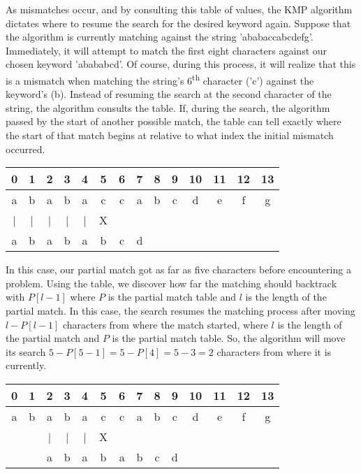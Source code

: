 As mismatches occur, and by consulting this table of values, the KMP algorithm dictates where to resume the search for the desired keyword again.
Suppose that the algorithm is currently matching against the string 'ababaccabcdefg'.
Immediately, it will attempt to match the first eight characters against our chosen keyword 'abababcd'.
Of course, during this process, it will realize that this is a mismatch when matching the string's 6\textsuperscript{th} character ('c') against the keyword's (b).
Instead of resuming the search at the second character of the string, the algorithm consults the table.
If, during the search, the algorithm passed by the start of another possible match, the table can tell exactly where the start of that match begins at relative to what index the initial mismatch occurred.

\begin{table}[h]
	\begin{center}
		\begin{tabular}{ | c | c | c | c | c | c | c | c | c | c | c | c | c | c | }
			\hline
			0 & 1 & 2 & 3 & 4 & 5 & 6 & 7 & 8 & 9 & 10 & 11 & 12 & 13 \\ \hline
			a & b & a & b & a & c & c & a & b & c & d & e & f & g \\ \hline
			| & | & | & | & | & X &   &   &   &   &   &   &   &   \\ \hline
			a & b & a & b & a & b & c & d &   &   &   &   &   &   \\ \hline
		\end{tabular}
	\end{center}
\end{table}

In this case, our partial match got as far as five characters before encountering a problem.
Using the table, we discover how far the matching should backtrack with $P[l - 1]$ where $P$ is the partial match table and $l$ is the length of the partial match.
In this case, the search resumes the matching process after moving $l - P[l - 1]$ characters from where the match started, where $l$ is the length of the partial match and $P$ is the partial match table.
So, the algorithm will move its search $5 - P[5 - 1] = 5 - P[4] = 5 - 3 = 2$ characters from where it is currently.

\begin{table}[h]
	\begin{center}
		\begin{tabular}{ | c | c | c | c | c | c | c | c | c | c | c | c | c | c | }
			\hline
			0 & 1 & 2 & 3 & 4 & 5 & 6 & 7 & 8 & 9 & 10 & 11 & 12 & 13 \\ \hline
			a & b & a & b & a & c & c & a & b & c & d & e & f & g \\ \hline
			  &   & | & | & | & X &   &   &   &   &   &   &   &   \\ \hline
			  &   & a & b & a & b & a & b & c & d &   &   &   &   \\ \hline
		\end{tabular}
	\end{center}
\end{table}

